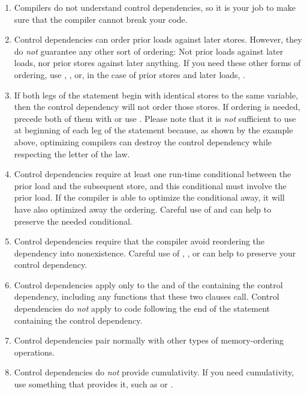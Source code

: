 \begin{enumerate}
\item	Compilers do not understand control dependencies, so it is
	your job to make sure that the compiler cannot break your code.

\item	Control dependencies can order prior loads against later stores.
	However, they do \emph{not} guarantee any other sort of ordering:
	Not prior loads against later loads, nor prior stores against
	later anything.
	If you need these other forms of ordering, use ,
	, or, in the case of prior stores and later loads,
	.

\item	If both legs of the  statement begin with identical stores
	to the same variable, then the control dependency will not order
	those stores.
	If ordering is needed, precede both of them with  or
	use .
	Please note that it is \emph{not} sufficient to use 
	at beginning of each leg of the  statement because, as shown
	by the example above, optimizing compilers can destroy the control
	dependency while respecting the letter of the  law.

\item	Control dependencies require at least one run-time conditional
	between the prior load and the subsequent store, and this
	conditional must involve the prior load.
	If the compiler is able to optimize the conditional away, it
	will have also optimized away the ordering.
	Careful use of  and  can help
	to preserve the needed conditional.

\item	Control dependencies require that the compiler avoid reordering
	the dependency into nonexistence.
	Careful use of , , or
	 can help to preserve your control
	dependency.

\item	Control dependencies apply only to the  and
	 of the  containing the control
	dependency, including any functions that these two clauses call.
	Control dependencies do \emph{not} apply to code following the
	end of the  statement containing the control dependency.

\item	Control dependencies pair normally with other types of
	memory-ordering operations.

\item	Control dependencies do \emph{not} provide cumulativity.
	If you need cumulativity, use something that provides it,
	such as  or .
\end{enumerate}

